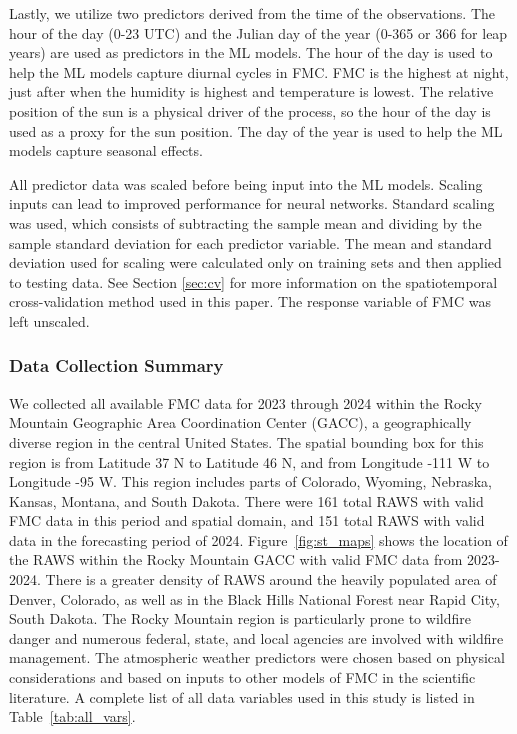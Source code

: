 \documentclass[fire,article,submit,pdftex,moreauthors]{Definitions/mdpi}
\begin{document}
Lastly, we utilize two predictors derived from the time of the observations. The hour of the day (0-23 UTC) and the Julian day of the year (0-365 or 366 for leap years) are used as predictors in the ML models. The hour of the day is used to help the ML models capture diurnal cycles in FMC. FMC is the highest at night, just after when the humidity is highest and temperature is lowest. The relative position of the sun is a physical driver of the process, so the hour of the day is used as a proxy for the sun position. The day of the year is used to help the ML models capture seasonal effects.

All predictor data was scaled before being input into the ML models. Scaling inputs can lead to improved performance for neural networks. Standard scaling was used, which consists of subtracting the sample mean and dividing by the sample standard deviation for each predictor variable. The mean and standard deviation used for scaling were calculated only on training sets and then applied to testing data. See Section \ref{sec:cv} for more information on the spatiotemporal cross-validation method used in this paper. The response variable of FMC was left unscaled.
\subsubsection{Data Collection Summary}
We collected all available FMC data for 2023 through 2024 within the Rocky Mountain Geographic Area Coordination Center (GACC), a geographically diverse region in the central United States. The spatial bounding box for this region is from Latitude 37 N to Latitude 46 N, and from Longitude -111 W to Longitude -95 W. This region includes parts of Colorado, Wyoming, Nebraska, Kansas, Montana, and South Dakota. There were 161 total RAWS with valid FMC data in this period and spatial domain, and 151 total RAWS with valid data in the forecasting period of 2024. Figure~\ref{fig:st_maps} shows the location of the RAWS within the Rocky Mountain GACC with valid FMC data from 2023-2024. There is a greater density of RAWS around the heavily populated area of Denver, Colorado, as well as in the Black Hills National Forest near Rapid City, South Dakota. The Rocky Mountain region is particularly prone to wildfire danger and numerous federal, state, and local agencies are involved with wildfire management. The atmospheric weather predictors were chosen based on physical considerations and based on inputs to other models of FMC in the scientific literature. A complete list of all data variables used in this study is listed in Table~\ref{tab:all_vars}.
\end{document}
